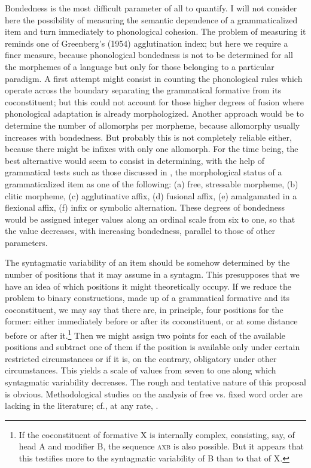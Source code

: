 Bondedness is the most difficult parameter of all to quantify. I will not consider here the possibility of measuring the semantic dependence of a grammaticalized item and turn immediately to phonological cohesion. The problem of measuring it reminds one of Greenberg's (1954) agglutination index; but here we require a finer measure, because phonological bondedness is not to be determined for all the morphemes of a language but only for those belonging to a particular paradigm. A first attempt might consist in counting the phonological rules which operate across the boundary separating the grammatical formative from its coconstituent; but this could not account for those higher degrees of fusion where phonological adaptation is already morphologized. Another approach would be to determine the number of allomorphs per morpheme, because allomorphy usually increases with bondedness. But probably this is not completely reliable either, because there might be infixes with only one allomorph. For the time being, the best alternative would seem to consist in determining, with the help of grammatical tests such as those discussed in , the morphological status of a grammaticalized item as one of the following: (a) free, stressable morpheme, (b) clitic morpheme, (c) agglutinative affix, (d) fusional affix, (e) amalgamated in a flexional affix, (f) infix or symbolic alternation. These degrees of bondedness would be assigned integer values along an ordinal scale from six to one, so that the value decreases, with increasing bondedness, parallel to those of other parameters.

The syntagmatic variability of an item should be somehow determined by the number of positions that it may assume in a syntagm. This presupposes that we have an idea of which positions it might theoretically occupy. If we reduce the problem to binary constructions, made up of a grammatical formative and its coconstituent, we may say that there are, in principle, four positions for the former: either immediately before or after its coconstituent, or at some distance before or after it.\footnote{If the coconstituent of formative X is internally complex, consisting, say, of head A and modifier B, the sequence \textsc{axb} is also possible. But it appears that this testifies more to the syntagmatic variability of B than to that of X.} Then we might assign two points for each of the available positions and subtract one of them if the position is available only under certain restricted circumstances or if it is, on the contrary, obligatory under other circumstances. This yields a scale of values from seven to one along which syntagmatic variability decreases.%
 The rough and tentative nature of this proposal is obvious. Methodological studies on the analysis of free vs. fixed word order are lacking in the literature; cf., at any rate, \citet{Steele1978}.

